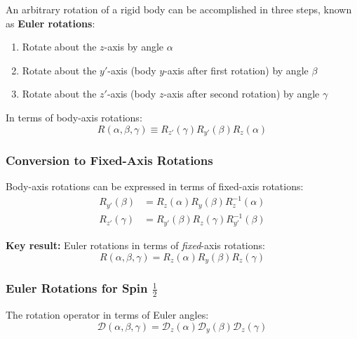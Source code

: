 \documentclass[11pt,a4paper]{article}
\begin{document}
An arbitrary rotation of a rigid body can be accomplished in three steps, known as \textbf{Euler rotations}:

\begin{enumerate}
\item Rotate about the $z$-axis by angle $\alpha$
\item Rotate about the $y'$-axis (body $y$-axis after first rotation) by angle $\beta$
\item Rotate about the $z'$-axis (body $z$-axis after second rotation) by angle $\gamma$
\end{enumerate}

In terms of body-axis rotations:
\begin{equation}
R(\alpha, \beta, \gamma) \equiv R_{z'}(\gamma)R_{y'}(\beta)R_z(\alpha)
\tag{3.85}
\end{equation}

\subsubsection{Conversion to Fixed-Axis Rotations}

Body-axis rotations can be expressed in terms of fixed-axis rotations:
\begin{align}
R_{y'}(\beta) &= R_z(\alpha)R_y(\beta)R_z^{-1}(\alpha) \tag{3.86} \\
R_{z'}(\gamma) &= R_{y'}(\beta)R_z(\gamma)R_{y'}^{-1}(\beta) \tag{3.87}
\end{align}

\textbf{Key result:} Euler rotations in terms of \textit{fixed}-axis rotations:
\begin{equation}
\boxed{R(\alpha, \beta, \gamma) = R_z(\alpha)R_y(\beta)R_z(\gamma)}
\tag{3.89}
\end{equation}

\subsubsection{Euler Rotations for Spin $\frac{1}{2}$}

The rotation operator in terms of Euler angles:
\begin{equation}
\mathscr{D}(\alpha, \beta, \gamma) = \mathscr{D}_z(\alpha)\mathscr{D}_y(\beta)\mathscr{D}_z(\gamma)
\tag{3.90}
\end{equation}
\end{document}
